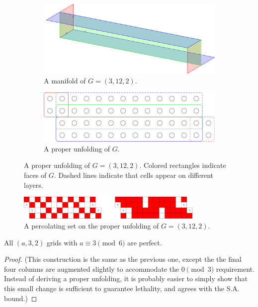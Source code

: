 \begin{figure}[]
\centering
\begin{subfigure}{0.45\textwidth}
	\includegraphics[width=\textwidth]{figures/7/3x12x2_manifold_3d.pdf}
	\caption{A manifold of $G= (3,12,2)$.}
	\label{}
\end{subfigure} \hfill%
\begin{subfigure}{0.45\textwidth}
	\includegraphics[width=\textwidth]{figures/7/3x12x2_manifold.pdf}
	\caption{A proper unfolding of $G$.}
	\label{}
\end{subfigure}
\caption{A proper unfolding of $G= (3,12,2)$. Colored rectangles indicate faces of $G$. Dashed lines indicate that cells appear on different layers. }
\label{fig:3x12x2_manifold}
\end{figure} 

\begin{figure}[]
\centering
\includegraphics[width=0.8\textwidth]{figures/7/3x12x2_unfolded_lethal.pdf}
\caption{A percolating set on the proper unfolding of $G= (3,12,2)$.}
\label{fig:3x12x2_unfolded_lethal}
\end{figure} 

\begin{con}
All $(a,3,2)$ grids with $a \equiv 3 \pmod 6$ are perfect. 
\end{con}

\begin{proof}
(This construction is the same as the previous one, except the the final four columns are augmented slightly to accommodate the $0 \pmod 3$ requirement. Instead of deriving a proper unfolding, it is probably easier to simply show that this small change is sufficient to guarantee lethality, and agrees with the S.A. bound.)
\end{proof}

